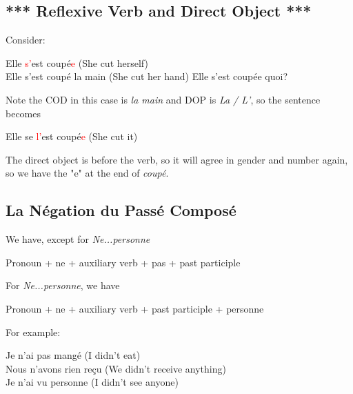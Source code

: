 \documentclass{book}
\begin{document}
\subsection{*** Reflexive Verb and Direct Object ***}
Consider:
\begin{center}
    Elle \textcolor{red}{s'}est coupé\textcolor{red}{e} (She cut herself) \\
    Elle s'est coupé la main (She cut her hand)
    Elle s'est coupée quoi?
\end{center}
Note the COD in this case is \textit{la main} and DOP is \textit{La / L'}, so the sentence becomes
\begin{center}
    Elle se \textcolor{red}{l'}est coupé\textcolor{red}{e} (She cut it)
\end{center}
The direct object is before the verb, so it will agree in gender and number again, so we have the "e" at the end of \textit{coupé}.

\subsection{La Négation du Passé Composé}
We have, except for \textit{Ne...personne}
\begin{center}
    Pronoun + ne + auxiliary verb + pas + past participle
\end{center}
For \textit{Ne...personne}, we have
\begin{center}
    Pronoun + ne + auxiliary verb + past participle + personne
\end{center}
For example:
\begin{center}
    Je n'ai pas mangé (I didn't eat) \\
    Nous n'avons rien reçu (We didn't receive anything) \\
    Je n'ai vu personne (I didn't see anyone)
\end{center}
\end{document}
